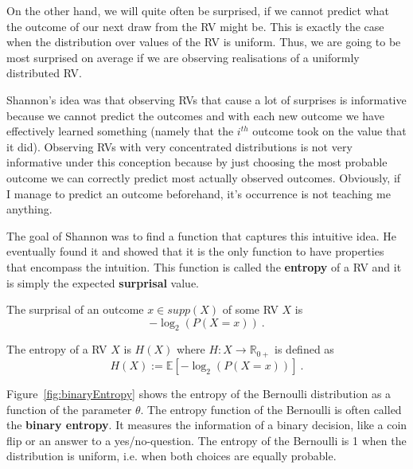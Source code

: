 On the other hand, we will quite often be surprised,
if we cannot predict what the outcome of our next draw from the RV might be. This is exactly the case when the distribution over values of the RV is uniform. Thus,
we are going to be most surprised on average if we are observing realisations of a uniformly distributed RV.

Shannon's idea was that observing RVs that cause a lot of surprises is informative because we cannot predict the outcomes and with each new outcome we have effectively
learned something  (namely that the $ i^{th} $ outcome took on the value that it did). Observing RVs with very concentrated distributions is not very informative
under this conception because by just choosing the most probable outcome we can correctly predict most actually observed outcomes. Obviously, if I manage to predict
an outcome beforehand, it's occurrence is not teaching me anything.

The goal of Shannon was to find a function that captures this intuitive idea. He eventually found it and showed that it is the only function to have properties
that encompass the intuition. This function is called the \textbf{entropy} of a RV and it is simply the expected \textbf{surprisal} value.

\begin{Definition}[Surprisal]
The surprisal of an outcome $ x \in supp(X) $ of some RV $ X $ is
$$ -\log_{2}(P(X=x)) \ . $$
\end{Definition} 

\begin{Definition}[Entropy]
The entropy of a RV $ X $ is $ H(X) $ where $ H : X \rightarrow \mathbb{R}_{0+} $ is defined as
$$ H(X) := \mathbb{E}[-\log_{2}(P(X=x))] \ . $$
\end{Definition}

Figure~\ref{fig:binaryEntropy} shows the entropy of the Bernoulli distribution as a function of the
parameter $ \theta $. The entropy function of the Bernoulli is often called the \textbf{binary entropy}.
It measures the information of a binary decision, like a coin flip or an answer to a yes/no-question.
The entropy of the Bernoulli is 1 when the distribution is uniform, i.e. when both choices are equally 
probable. 

